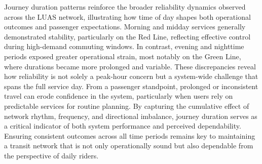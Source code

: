     Journey duration patterns reinforce the broader reliability dynamics observed across the LUAS network, illustrating how time of day shapes both operational outcomes and passenger expectations. Morning and midday services generally demonstrated stability, particularly on the Red Line, reflecting effective control during high-demand commuting windows. In contrast, evening and nighttime periods exposed greater operational strain, most notably on the Green Line, where durations became more prolonged and variable. These discrepancies reveal how reliability is not solely a peak-hour concern but a system-wide challenge that spans the full service day. From a passenger standpoint, prolonged or inconsistent travel can erode confidence in the system, particularly when users rely on predictable services for routine planning. By capturing the cumulative effect of network rhythm, frequency, and directional imbalance, journey duration serves as a critical indicator of both system performance and perceived dependability. Ensuring consistent outcomes across all time periods remains key to maintaining a transit network that is not only operationally sound but also dependable from the perspective of daily riders.


